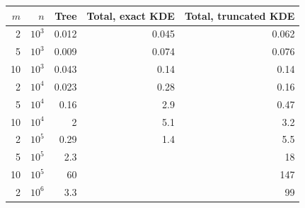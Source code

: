 \begin{tabular}{rrrrr}
\toprule
$m$ & $n$ & Tree & Total, exact KDE & Total, truncated KDE \\
\midrule
2 & $10^{3}$ & 0.012 & 0.045 & 0.062 \\
5 & $10^{3}$ & 0.009 & 0.074 & 0.076 \\
10 & $10^{3}$ & 0.043 & 0.14 & 0.14 \\
2 & $10^{4}$ & 0.023 & 0.28 & 0.16 \\
5 & $10^{4}$ & 0.16 & 2.9 & 0.47 \\
10 & $10^{4}$ &   2 & 5.1 & 3.2 \\
2 & $10^{5}$ & 0.29 & 1.4 & 5.5 \\
5 & $10^{5}$ & 2.3 &  &  18 \\
10 & $10^{5}$ &  60 &  & 147 \\
2 & $10^{6}$ & 3.3 &  &  99 \\
\bottomrule
\end{tabular}
